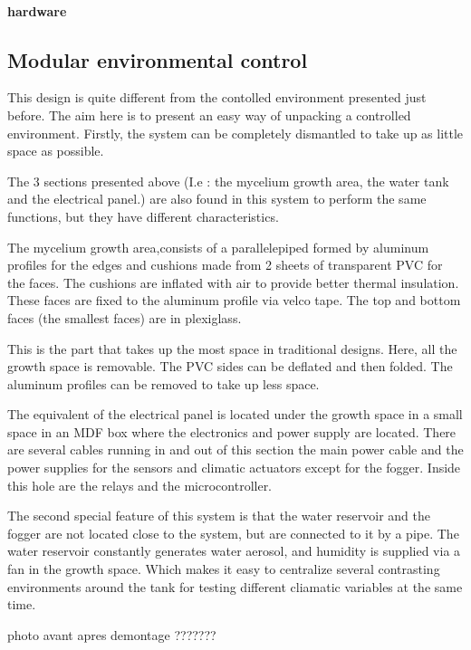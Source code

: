 \paragraph{hardware}

\subsection{Modular environmental control}

This design is quite different from the contolled environment presented just before. 
The aim here is to present an easy way of unpacking a controlled environment. Firstly, the system can be completely dismantled to take up as little space as possible. 

The 3 sections presented above (I.e : the mycelium growth area, the water tank and the electrical panel.) are also found in this system to perform the same functions, but they have different characteristics.

The mycelium growth area,consists of a parallelepiped formed by aluminum profiles for the edges and cushions made from 2 sheets of transparent PVC for the faces. The cushions are inflated with air to provide better thermal insulation. These faces are fixed to the aluminum profile via velco tape. The top and bottom faces (the smallest faces) are in plexiglass. 

This is the part that takes up the most space in traditional designs. Here, all the growth  space is removable. The PVC sides can be deflated and then folded. The aluminum profiles can be removed to take up less space.

The equivalent of the electrical panel is located under the growth space in a small space in an MDF box where the electronics and power supply are located. There are several cables running in and out of this section the main power cable and the power supplies for the sensors and climatic actuators except for the fogger. Inside this hole are the relays and the microcontroller. 

The second special feature of this system is that the water reservoir and the fogger are not located close to the system, but are connected to it by a pipe. The water reservoir constantly generates water aerosol, and humidity is supplied via a fan in the growth space. 
Which makes it easy to centralize several contrasting environments around the tank for testing different cliamatic variables at the same time. 

photo avant apres demontage ???????









